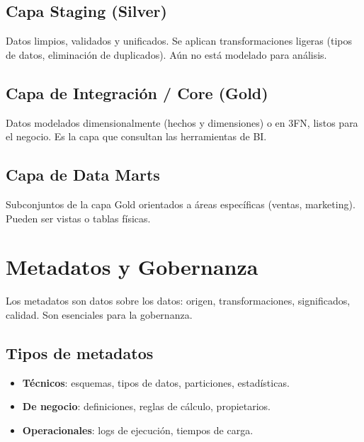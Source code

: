 \documentclass[12pt,a4paper,openany,oneside]{book}
\begin{document}
\section{Capa Staging (Silver)}
Datos limpios, validados y unificados. Se aplican transformaciones ligeras (tipos de datos, eliminación de duplicados). Aún no está modelado para análisis.

\section{Capa de Integración / Core (Gold)}
Datos modelados dimensionalmente (hechos y dimensiones) o en 3FN, listos para el negocio. Es la capa que consultan las herramientas de BI.

\section{Capa de Data Marts}
Subconjuntos de la capa Gold orientados a áreas específicas (ventas, marketing). Pueden ser vistas o tablas físicas.

\begin{center}
\end{center}

\chapter{Metadatos y Gobernanza}
Los metadatos son datos sobre los datos: origen, transformaciones, significados, calidad. Son esenciales para la gobernanza.

\section{Tipos de metadatos}
\begin{itemize}
    \item \textbf{Técnicos}: esquemas, tipos de datos, particiones, estadísticas.
    \item \textbf{De negocio}: definiciones, reglas de cálculo, propietarios.
    \item \textbf{Operacionales}: logs de ejecución, tiempos de carga.
\end{itemize}
\end{document}
